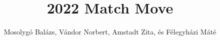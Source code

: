 \documentclass[sigplan,11pt,nonacm=true]{acmart}
\begin{document}
\title{2022 Match Move}


\author{Mosolygó Balázs, Vándor Norbert, Amstadt Zita, és Félegyházi Máté}


\maketitle






\end{document}
